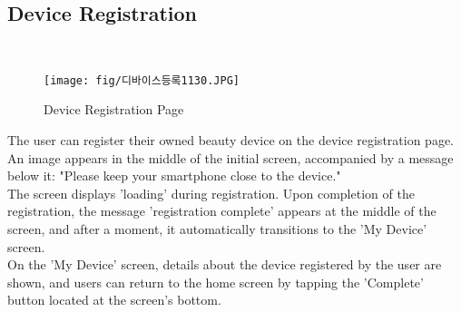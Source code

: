\documentclass[conference]{IEEEtran}
\begin{document}
\subsection{Device Registration}\\
    \begin{figure}[htb]
    \centering
    \texttt{[image: fig/디바이스등록1130.JPG]}
    \label{fig:Device Registration Page}
    \caption{Device Registration Page} 
    \end{figure}
The user can register their owned beauty device on the device registration page. An image appears in the middle of the initial screen, accompanied by a message below it: "Please keep your smartphone close to the device."\\
 The screen displays 'loading' during registration. Upon completion of the registration, the message 'registration complete' appears at the middle of the screen, and after a moment, it automatically transitions to the 'My Device' screen.\\
On the 'My Device' screen, details about the device registered by the user are shown, and users can return to the home screen by tapping the 'Complete' button located at the screen's bottom.\\
    
\end{document}
